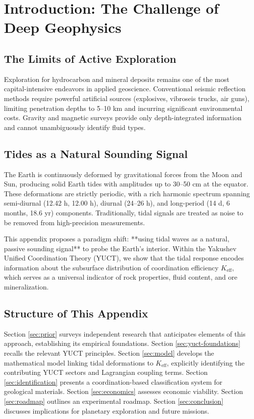 \documentclass[12pt,a4paper]{article}
\theoremstyle{remark}
\newcommand{\Keff}{K_{\mathrm{eff}}}
\begin{document}
	\tableofcontents
	\newpage
	
	\section{Introduction: The Challenge of Deep Geophysics}
	\label{sec:intro}
	
	\subsection{The Limits of Active Exploration}
	
	Exploration for hydrocarbon and mineral deposits remains one of the most capital-intensive endeavors in applied geoscience. Conventional seismic reflection methods require powerful artificial sources (explosives, vibroseis trucks, air guns), limiting penetration depths to 5–10 km and incurring significant environmental costs. Gravity and magnetic surveys provide only depth-integrated information and cannot unambiguously identify fluid types.
	
	\subsection{Tides as a Natural Sounding Signal}
	
	The Earth is continuously deformed by gravitational forces from the Moon and Sun, producing solid Earth tides with amplitudes up to 30–50 cm at the equator. These deformations are strictly periodic, with a rich harmonic spectrum spanning semi-diurnal (12.42 h, 12.00 h), diurnal (24–26 h), and long-period (14 d, 6 months, 18.6 yr) components. Traditionally, tidal signals are treated as noise to be removed from high-precision measurements.
	
	This appendix proposes a paradigm shift: **using tidal waves as a natural, passive sounding signal** to probe the Earth's interior. Within the Yakushev Unified Coordination Theory (YUCT), we show that the tidal response encodes information about the subsurface distribution of coordination efficiency $\Keff$, which serves as a universal indicator of rock properties, fluid content, and ore mineralization.
	
	\subsection{Structure of This Appendix}
	
	Section \ref{sec:prior} surveys independent research that anticipates elements of this approach, establishing its empirical foundations. Section \ref{sec:yuct-foundations} recalls the relevant YUCT principles. Section \ref{sec:model} develops the mathematical model linking tidal deformations to $\Keff$, explicitly identifying the contributing YUCT sectors and Lagrangian coupling terms. Section \ref{sec:identification} presents a coordination-based classification system for geological materials. Section \ref{sec:economics} assesses economic viability. Section \ref{sec:roadmap} outlines an experimental roadmap. Section \ref{sec:conclusion} discusses implications for planetary exploration and future missions.
	
\end{document}
